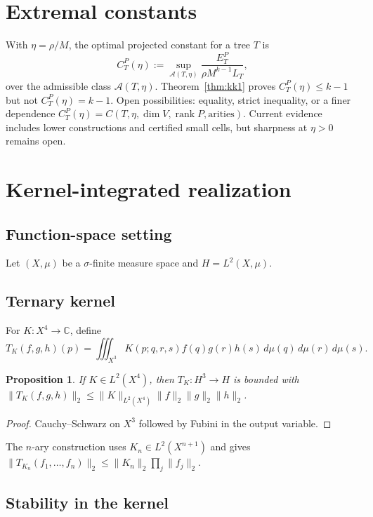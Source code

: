 \documentclass[11pt]{amsart}
\newtheorem{proposition}[theorem]{Proposition}
\theoremstyle{definition}
\theoremstyle{remark}
\begin{document}
\section{Extremal constants}

With $\eta=\rho/M$, the optimal projected constant for a tree $T$ is
\[
C_T^{P}(\eta) := \sup_{\mathcal A(T,\eta)} \frac{E_T^P}{\rho M^{k-1}L_T},
\]
over the admissible class $\mathcal A(T,\eta)$. Theorem~\ref{thm:kk1}
proves $C_T^P(\eta)\le k-1$ but not $C_T^P(\eta)=k-1$. Open
possibilities: equality, strict inequality, or a finer dependence
$C_T^P(\eta) = C(T,\eta,\dim V,\operatorname{rank}P,\text{arities})$.
Current evidence includes lower constructions and certified small
cells, but sharpness at $\eta>0$ remains open.

\section{Kernel-integrated realization}
\label{sec:xv}

\subsection{Function-space setting}

Let $(X,\mu)$ be a $\sigma$-finite measure space and $H=L^2(X,\mu)$.

\subsection{Ternary kernel}

For $K:X^4\to\mathbb C$, define
\[
T_K(f,g,h)(p) = \iiint_{X^3} K(p;q,r,s)f(q)g(r)h(s)\,d\mu(q)\,d\mu(r)\,d\mu(s).
\]

\begin{proposition}
If $K\in L^2(X^4)$, then $T_K:H^3\to H$ is bounded with
$\lVert T_K(f,g,h)\rVert_2 \le \lVert K\rVert_{L^2(X^4)}\lVert f\rVert_2\lVert g\rVert_2\lVert h\rVert_2$.
\end{proposition}
\begin{proof}
Cauchy--Schwarz on $X^3$ followed by Fubini in the output variable.
\end{proof}
The $n$-ary construction uses $K_n\in L^2(X^{n+1})$ and gives
$\lVert T_{K_n}(f_1,\ldots,f_n)\rVert_2 \le \lVert K_n\rVert_2\prod_j\lVert f_j\rVert_2$.

\subsection{Stability in the kernel}
\end{document}
